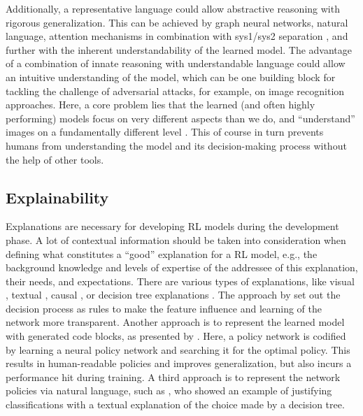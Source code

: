 \documentclass[twoside,11pt]{article}
\begin{document}
Additionally, a representative language could allow abstractive reasoning with rigorous generalization. This can be achieved by graph neural networks, natural language, attention mechanisms in combination with sys1/sys2 separation \citep{RoyEtAl:2021:RLRoboticsChallenges}, and further with the inherent understandability of the learned model.
The advantage of a combination of innate reasoning with understandable language could allow an intuitive understanding of the model, which can be one building block for tackling the challenge of adversarial attacks, for example, on image recognition approaches. Here, a core problem lies that the learned (and often highly performing) models focus on very different aspects than we do, and ``understand'' images on a fundamentally different level \citep{ChakrabortyEtAl:2021:SurveyAdversarialAttacks}. This of course in turn prevents humans from understanding the model and its decision-making process without the help of other tools.

\subsection{Explainability}

Explanations are necessary for developing RL models during the development phase. A lot of contextual information should be taken into consideration when defining what constitutes a ``good” explanation for a RL model, e.g., the background knowledge and levels of expertise of the addressee of this explanation, their needs, and expectations. There are various types of explanations, like visual \citep{DBLP:journals/corr/abs-1912-12191,DBLP:journals/corr/abs-1912-05743}, textual \citep{fukuchi2017autonomous,HayesShah:2017:AutonomousPolicyExplanation}, causal \citep{MadumalEtAl:2020:CausalRLCFs,Madumal:2020:DistalEF}, or decision tree explanations \citep{bastani2018verifiable}. The approach by \citet{LiuEtAl:2018:LinearModelUTrees} set out the decision process as rules to make the feature influence and learning of the network more transparent. Another approach is to represent the learned model with generated code blocks, as presented by \citet{VermaEtAl:2018:ProgrammaticallyInterpretableRL}. Here, a policy network is codified by learning a neural policy network and searching it for the optimal policy. This results in human-readable policies and improves generalization, but also incurs a performance hit during training. A third approach is to represent the network policies via natural language, such as \citet{AlonsoEtAl:2018:xAINLBeerClassifier}, who showed an example of justifying classifications with a textual explanation of the choice made by a decision tree.
\end{document}
